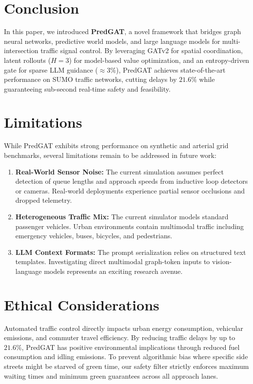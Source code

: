 \documentclass[11pt,a4paper,twocolumn]{article}
\begin{document}
\section{Conclusion}
\label{sec:conclusion}
In this paper, we introduced \textbf{PredGAT}, a novel framework that bridges graph neural networks, predictive world models, and large language models for multi-intersection traffic signal control. By leveraging GATv2 for spatial coordination, latent rollouts ($H=3$) for model-based value optimization, and an entropy-driven gate for sparse LLM guidance ($\approx 3\%$), PredGAT achieves state-of-the-art performance on SUMO traffic networks, cutting delays by $21.6\%$ while guaranteeing sub-second real-time safety and feasibility.

\section*{Limitations}
While PredGAT exhibits strong performance on synthetic and arterial grid benchmarks, several limitations remain to be addressed in future work:
\begin{enumerate}
    \item \textbf{Real-World Sensor Noise:} The current simulation assumes perfect detection of queue lengths and approach speeds from inductive loop detectors or cameras. Real-world deployments experience partial sensor occlusions and dropped telemetry.
    \item \textbf{Heterogeneous Traffic Mix:} The current simulator models standard passenger vehicles. Urban environments contain multimodal traffic including emergency vehicles, buses, bicycles, and pedestrians.
    \item \textbf{LLM Context Formats:} The prompt serialization relies on structured text templates. Investigating direct multimodal graph-token inputs to vision-language models represents an exciting research avenue.
\end{enumerate}

\section*{Ethical Considerations}
Automated traffic control directly impacts urban energy consumption, vehicular emissions, and commuter travel efficiency. By reducing traffic delays by up to $21.6\%$, PredGAT has positive environmental implications through reduced fuel consumption and idling emissions. To prevent algorithmic bias where specific side streets might be starved of green time, our safety filter strictly enforces maximum waiting times and minimum green guarantees across all approach lanes.
\end{document}
